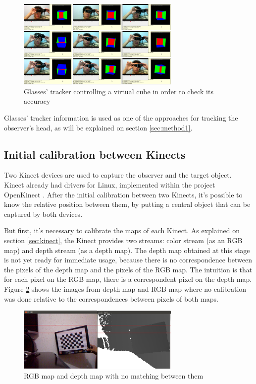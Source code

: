 \documentclass[msc, a4paper, classic, en]{ufbathesis}
\begin{document}
\begin{figure}
\centering
\includegraphics[width=0.7\textwidth]{images/glassescube.png}
\caption{Glasses' tracker controlling a virtual cube in order to check its accuracy}
\label{fig:glassescube}
\end{figure}

Glasses' tracker information is used as one of the approaches for tracking the observer's head, as will be explained on section \ref{sec:method1}.

\subsection{Initial calibration between Kinects}
\label{sec:kinectscalib}

Two Kinect devices are used to capture the observer and the target object. Kinect already had drivers for Linux, implemented within the project OpenKinect \cite{openkinect}. After the initial calibration between two Kinects, it's possible to know the relative position between them, by putting a central object that can be captured by both devices.

But first, it's necessary to calibrate the maps of each Kinect. As explained on section \ref{sec:kinect}, the Kinect provides two streams: color stream (as an RGB map) and depth stream (as a depth map). The depth map obtained at this stage is not yet ready for immediate usage, because there is no correspondence between the pixels of the depth map and the pixels of the RGB map. The intuition is that for each pixel on the RGB map, there is a correspondent pixel on the depth map. Figure \ref{fig:kinectnotcal} shows the images from depth map and RGB map where no calibration was done relative to the correspondences between pixels of both maps.

\begin{figure}
\centering
\includegraphics[width=0.7\textwidth]{images/kinectnocal.png}
\caption{RGB map and depth map with no matching between them}
\label{fig:kinectnotcal}
\end{figure}
\end{document}
